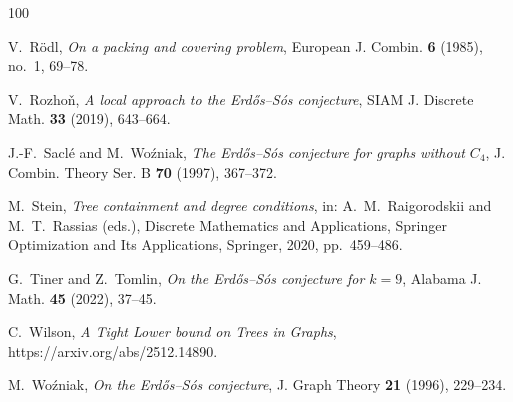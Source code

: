\documentclass[11pt]{article}
\theoremstyle{remark}
\numberwithin{equation}{section}
\begin{document}
\begin{thebibliography}{100}
		
		V.~R\"odl,
		\emph{On a packing and covering problem},
		European J. Combin. \textbf{6} (1985), no.~1, 69--78.
		
		 V.~Rozho\v{n}, \emph{A local approach to the Erd{\H{o}}s--S{\'o}s conjecture}, SIAM J. Discrete Math. \textbf{33} (2019), 643--664.
		
		 J.-F.~Sacl{\'e} and M.~Wo{\'z}niak, \emph{The Erd{\H{o}}s--S{\'o}s conjecture for graphs without $C_4$}, J. Combin. Theory Ser. B \textbf{70} (1997), 367--372. 
		
		 M.~Stein, \emph{Tree containment and degree conditions}, in: A.~M.~Raigorodskii and M.~T.~Rassias (eds.), Discrete Mathematics and Applications, Springer Optimization and Its Applications, Springer, 2020, pp.~459--486. 
		
		 G.~Tiner and Z.~Tomlin, \emph{On the Erd{\H{o}}s--S{\'o}s conjecture for $k=9$}, Alabama J. Math. \textbf{45} (2022), 37--45.
		
		 C.~Wilson, \emph{A Tight Lower bound on Trees in Graphs}, https://arxiv.org/abs/2512.14890. 
		
		 M.~Wo{\'z}niak, \emph{On the Erd{\H{o}}s--S{\'o}s conjecture}, J. Graph Theory \textbf{21} (1996), 229--234.
		
	\end{thebibliography}
	
\end{document}
